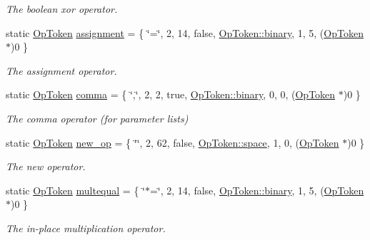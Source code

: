 \begin{DoxyCompactItemize}
\begin{DoxyCompactList}\small\item\em The {\itshape boolean} {\itshape xor} operator. \end{DoxyCompactList}\item 
static \mbox{\hyperlink{class_op_token}{Op\+Token}} \mbox{\hyperlink{class_print_c_a2d38a1553e6270e9940922c549411eae}{assignment}} = \{ \char`\"{}=\char`\"{}, 2, 14, false, \mbox{\hyperlink{class_op_token_af41c7f108d5662ede7765c5a6c44eaffa3a2ec63522a9329a71ddbe8adc3e752d}{Op\+Token\+::binary}}, 1, 5, (\mbox{\hyperlink{class_op_token}{Op\+Token}} $\ast$)0 \}
\begin{DoxyCompactList}\small\item\em The {\itshape assignment} operator. \end{DoxyCompactList}\item 
static \mbox{\hyperlink{class_op_token}{Op\+Token}} \mbox{\hyperlink{class_print_c_a1a77d4f930e5b2a7ef0a4e89d5cb6945}{comma}} = \{ \char`\"{},\char`\"{}, 2, 2, true, \mbox{\hyperlink{class_op_token_af41c7f108d5662ede7765c5a6c44eaffa3a2ec63522a9329a71ddbe8adc3e752d}{Op\+Token\+::binary}}, 0, 0, (\mbox{\hyperlink{class_op_token}{Op\+Token}} $\ast$)0 \}
\begin{DoxyCompactList}\small\item\em The {\itshape comma} operator (for parameter lists) \end{DoxyCompactList}\item 
static \mbox{\hyperlink{class_op_token}{Op\+Token}} \mbox{\hyperlink{class_print_c_af0b5719ea9e507609137db7749ef8aef}{new\+\_\+op}} = \{ \char`\"{}\char`\"{}, 2, 62, false, \mbox{\hyperlink{class_op_token_af41c7f108d5662ede7765c5a6c44eaffa07bc235399849635f28ca7caaaebb1a4}{Op\+Token\+::space}}, 1, 0, (\mbox{\hyperlink{class_op_token}{Op\+Token}} $\ast$)0 \}
\begin{DoxyCompactList}\small\item\em The {\itshape new} operator. \end{DoxyCompactList}\item 
static \mbox{\hyperlink{class_op_token}{Op\+Token}} \mbox{\hyperlink{class_print_c_ad5eb49438746692a23338c6a7815a83e}{multequal}} = \{ \char`\"{}$\ast$=\char`\"{}, 2, 14, false, \mbox{\hyperlink{class_op_token_af41c7f108d5662ede7765c5a6c44eaffa3a2ec63522a9329a71ddbe8adc3e752d}{Op\+Token\+::binary}}, 1, 5, (\mbox{\hyperlink{class_op_token}{Op\+Token}} $\ast$)0 \}
\begin{DoxyCompactList}\small\item\em The {\itshape in-\/place} {\itshape multiplication} operator. \end{DoxyCompactList}\item 

\end{DoxyCompactItemize}
